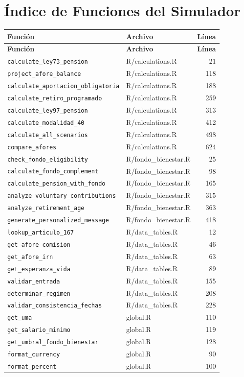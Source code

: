 \documentclass[11pt,a4paper]{report}
\begin{document}
\chapter{\'Indice de Funciones del Simulador}

\begin{center}
\begin{longtable}{llr}
\toprule
\textbf{Funci\'on} & \textbf{Archivo} & \textbf{L\'inea} \\
\midrule
\endfirsthead
\toprule
\textbf{Funci\'on} & \textbf{Archivo} & \textbf{L\'inea} \\
\midrule
\endhead
\texttt{calculate\_ley73\_pension} & R/calculations.R & 21 \\
\texttt{project\_afore\_balance} & R/calculations.R & 118 \\
\texttt{calculate\_aportacion\_obligatoria} & R/calculations.R & 188 \\
\texttt{calculate\_retiro\_programado} & R/calculations.R & 259 \\
\texttt{calculate\_ley97\_pension} & R/calculations.R & 313 \\
\texttt{calculate\_modalidad\_40} & R/calculations.R & 412 \\
\texttt{calculate\_all\_scenarios} & R/calculations.R & 498 \\
\texttt{compare\_afores} & R/calculations.R & 624 \\
\midrule
\texttt{check\_fondo\_eligibility} & R/fondo\_bienestar.R & 25 \\
\texttt{calculate\_fondo\_complement} & R/fondo\_bienestar.R & 98 \\
\texttt{calculate\_pension\_with\_fondo} & R/fondo\_bienestar.R & 165 \\
\texttt{analyze\_voluntary\_contributions} & R/fondo\_bienestar.R & 315 \\
\texttt{analyze\_retirement\_age} & R/fondo\_bienestar.R & 363 \\
\texttt{generate\_personalized\_message} & R/fondo\_bienestar.R & 418 \\
\midrule
\texttt{lookup\_articulo\_167} & R/data\_tables.R & 12 \\
\texttt{get\_afore\_comision} & R/data\_tables.R & 46 \\
\texttt{get\_afore\_irn} & R/data\_tables.R & 63 \\
\texttt{get\_esperanza\_vida} & R/data\_tables.R & 89 \\
\texttt{validar\_entrada} & R/data\_tables.R & 155 \\
\texttt{determinar\_regimen} & R/data\_tables.R & 208 \\
\texttt{validar\_consistencia\_fechas} & R/data\_tables.R & 228 \\
\midrule
\texttt{get\_uma} & global.R & 110 \\
\texttt{get\_salario\_minimo} & global.R & 119 \\
\texttt{get\_umbral\_fondo\_bienestar} & global.R & 128 \\
\texttt{format\_currency} & global.R & 90 \\
\texttt{format\_percent} & global.R & 100 \\
\bottomrule
\end{longtable}
\end{center}
\end{document}
